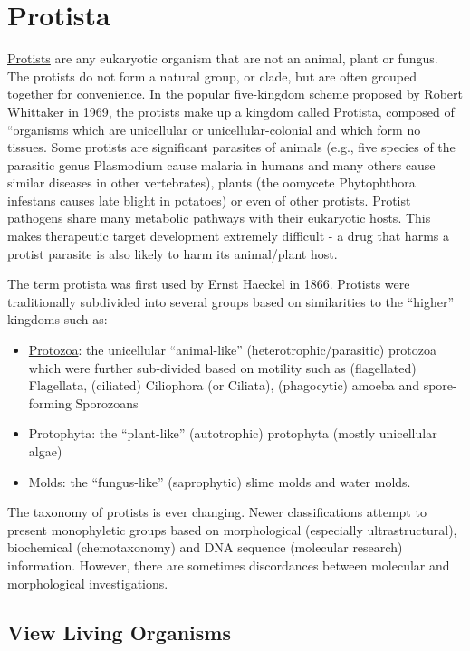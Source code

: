 \chapter{Protista}\label{protista}

\href{https://en.wikipedia.org/wiki/Protist}{Protists} are any
eukaryotic organism that are not an animal, plant or fungus. The
protists do not form a natural group, or clade, but are often grouped
together for convenience. In the popular five-kingdom scheme proposed by
Robert Whittaker in 1969, the protists make up a kingdom called
Protista, composed of ``organisms which are unicellular or
unicellular-colonial and which form no tissues. Some protists are
significant parasites of animals (e.g., five species of the parasitic
genus Plasmodium cause malaria in humans and many others cause similar
diseases in other vertebrates), plants (the oomycete Phytophthora
infestans causes late blight in potatoes) or even of other protists.
Protist pathogens share many metabolic pathways with their eukaryotic
hosts. This makes therapeutic target development extremely difficult - a
drug that harms a protist parasite is also likely to harm its
animal/plant host.

The term protista was first used by Ernst Haeckel in 1866. Protists were
traditionally subdivided into several groups based on similarities to
the ``higher'' kingdoms such as:

\begin{itemize}
\tightlist
\item
  \href{https://en.wikipedia.org/wiki/Protozoa}{Protozoa}: the
  unicellular ``animal-like'' (heterotrophic/parasitic) protozoa which
  were further sub-divided based on motility such as (flagellated)
  Flagellata, (ciliated) Ciliophora (or Ciliata), (phagocytic) amoeba
  and spore-forming Sporozoans
\item
  Protophyta: the ``plant-like'' (autotrophic) protophyta (mostly
  unicellular algae)
\item
  Molds: the ``fungus-like'' (saprophytic) slime molds and water molds.
\end{itemize}

The taxonomy of protists is ever changing. Newer classifications attempt
to present monophyletic groups based on morphological (especially
ultrastructural), biochemical (chemotaxonomy) and DNA sequence
(molecular research) information. However, there are sometimes
discordances between molecular and morphological investigations.

\section{View Living Organisms}\label{view-living-organisms-1}


